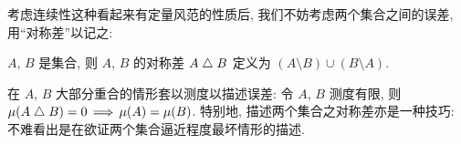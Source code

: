 考虑连续性这种看起来有定量风范的性质后, 我们不妨考虑两个集合之间的误差, 用``对称差''以记之:
\begin{defi}[对称差]
    $A$, $B$ 是集合, 则 $A$, $B$ 的对称差 $A\mathrel{\triangle} B$ 定义为 $(A\setminus B)\cup (B\setminus A)$.
\end{defi}
在 $A$, $B$ 大部分重合的情形套以测度以描述误差: 令 $A$, $B$ 测度有限, 则 $\mu (A\dif B)=0\implies \mu (A)=\mu (B)$. 特别地, 描述两个集合之对称差亦是一种技巧: 不难看出是在欲证两个集合逼近程度最坏情形的描述.
